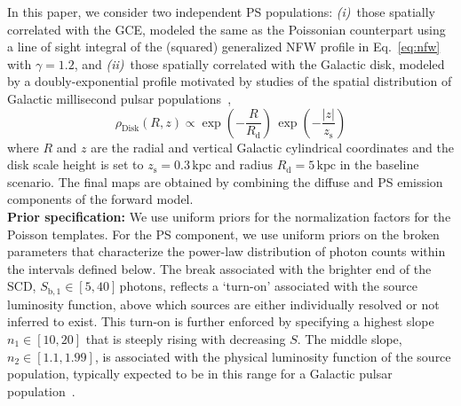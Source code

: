 \documentclass[prd,aps,10pt,nofootinbib,twocolumn,superscriptaddress,preprintnumbers,balancelastpage,longbibliography]{revtex4-1}
\begin{document}
In this paper, we consider two independent PS populations: \emph{(i)}~those spatially correlated with the GCE, modeled the same as the Poissonian counterpart using a line of sight integral of the (squared) generalized NFW profile in Eq.~\eqref{eq:nfw} with $\gamma = 1.2$, and \emph{(ii)}~those spatially correlated with the Galactic disk, modeled by a doubly-exponential profile motivated by studies of the spatial distribution of Galactic millisecond pulsar populations~\cite{Lorimer:2006qs, Bartels:2018xom},
\begin{equation}
\label{eq:disk_spatial}
\rho_\mathrm{Disk}(R, z) \propto \exp \left(-\frac{R}{R_\mathrm{d}}\right) \, \exp\left(-\frac{|z|}{z_\mathrm{s}}\right)
\end{equation}
where $R$ and $z$ are the radial and vertical Galactic cylindrical coordinates and the disk scale height is set to $z_\mathrm{s} = 0.3\,\mathrm{kpc}$ and radius $R_\mathrm{d} = 5\,\mathrm{kpc}$ in the baseline scenario. The final maps are obtained by combining the diffuse and PS emission components of the forward model. \\ 

\noindent
\textbf{Prior specification:} We use uniform priors for the normalization factors for the Poisson templates. For the PS component, we use uniform priors on the broken parameters that characterize the power-law  distribution of photon counts within the intervals defined below. The break associated with the brighter end of the SCD, $S_{\mathrm{b}, 1}  \in  [5, 40]$\,photons, reflects a `turn-on' associated with the source luminosity function, above which sources are either individually resolved or not inferred to exist. This turn-on is further enforced by specifying a highest slope $n_1 \in [10, 20]$ that is steeply rising with decreasing $S$. The middle slope, $n_2 \in [1.1, 1.99]$, is associated with the physical luminosity function of the source population, typically expected to be in this range for a Galactic pulsar population~\cite{Ploeg:2020jeh}. 
\end{document}
